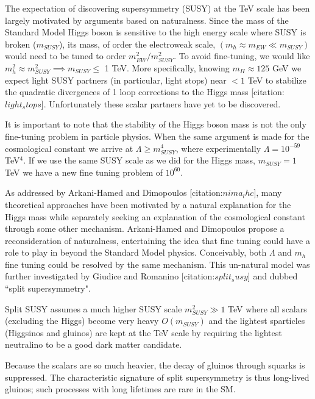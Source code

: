 The expectation of discovering supersymmetry (SUSY) at the TeV scale has been largely motivated
 by arguments based on naturalness. 
Since the mass of the Standard Model Higgs boson is sensitive to the high energy scale where SUSY
 is broken ($m_{SUSY}$), its mass, of order the electroweak scale, $(m_h \approx m_{EW} \ll m_{SUSY})$
 would need to be tuned to order $m_{EW}^2/m_{SUSY}^2$. 
To avoid fine-tuning, we would like  $m_h^2 \approx m_{SUSY}^2 \implies m_{SUSY} \leq$ 1 TeV. 
More specifically, knowing $m_H \approx 125$ GeV we expect light SUSY partners (in particular, light stops)
 near $< 1$ TeV to stabilize the quadratic divergences of 1 loop corrections to the Higgs mass
 [citation:$light_stops$]. 
Unfortunately these scalar partners have yet to be discovered.

It is important to note that the stability of the Higgs boson mass is not the only
 fine-tuning problem in particle physics. 
When the same argument is made for the cosmological constant we arrive at $\Lambda \geq m_{SUSY}^4$, 
where experimentally $\Lambda = 10^{-59}$ TeV$^4$.   
If we use the same SUSY scale as we did for the Higgs mass,
 $m_{SUSY} = 1$ TeV we have a new fine tuning problem of $10^{60}$.

As addressed by Arkani-Hamed and Dimopoulos [citation:$nima_lhc$], many theoretical approaches  have been
 motivated by a natural explanation for the Higgs mass while separately seeking an  explanation
 of the cosmological constant through some other mechanism.
Arkani-Hamed and Dimopoulos propose a reconsideration of naturalness, entertaining the idea that 
fine tuning could have a role to play in beyond the Standard Model physics.
Conceivably, both $\Lambda$ and $m_h$ fine tuning could be resolved by the same mechanism.  
This un-natural model was  further investigated by Giudice and Romanino [citation:$split_susy$]
and dubbed ``split supersymmetry". 

Split SUSY assumes a much higher SUSY scale $m_{SUSY}^2 \gg 1$ TeV where all scalars (excluding the Higgs) 
become very heavy $O(m_{SUSY})$ and the lightest sparticles (Higgsinos and gluinos) are kept at the TeV scale by requiring the lightest neutralino to be a good dark matter candidate. 

Because the scalars are so much heavier, the decay of gluinos through squarks is suppressed.
The characteristic signature of split supersymmetry is thus long-lived gluinos; such processes 
with long lifetimes are rare in the SM.
